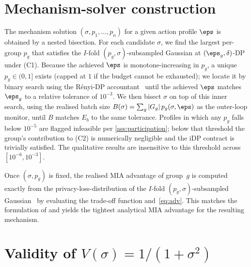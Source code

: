 \appendices

\section{Mechanism-solver construction}
\label{app:mechanism}

The mechanism solution $(\sigma, p_1,\dots,p_n)$ for a given action profile
$\boldsymbol{\eps}$ is obtained by a nested bisection. For each candidate
$\sigma$, we find the largest per-group $p_g$ that satisfies the $I$-fold
$(p_g, \sigma)$-subsampled Gaussian at $(\eps_g, \delta)$-DP under (C1).
Because the achieved $\eps$ is monotone-increasing in $p_g$, a unique $p_g
\in (0, 1]$ exists (capped at $1$ if the budget cannot be exhausted); we
locate it by binary search using the R\'enyi-DP
accountant~\cite{mironov2017renyi} until the achieved $\eps$ matches
$\eps_g$ to a relative tolerance of $10^{-3}$. We then bisect $\sigma$ on
top of this inner search, using the realised batch size $B(\sigma) =
\sum_g |G_g|\, p_g(\sigma, \boldsymbol{\eps})$ as the outer-loop monitor,
until $B$ matches $E_b$ to the same tolerance. Profiles in which any $p_g$
falls below $10^{-5}$ are flagged infeasible per
\cref{ass:participation}; below that threshold the group's contribution to
(C2) is numerically negligible and the iDP contract is trivially
satisfied. The qualitative results are insensitive to this threshold
across $[10^{-6}, 10^{-3}]$.

Once $(\sigma, p_g)$ is fixed, the realised MIA advantage of group~$g$ is
computed exactly from the privacy-loss-distribution of the $I$-fold
$(p_g, \sigma)$-subsampled Gaussian~\cite{google-dp-accounting} by
evaluating the trade-off function and~\eqref{eq:adv}. This matches the
formulation of \citet{kaiser2026your} and yields the tightest analytical
MIA advantage for the resulting mechanism.

\section{Validity of $V(\sigma) = 1/(1+\sigma^2)$}
\label{app:V}

